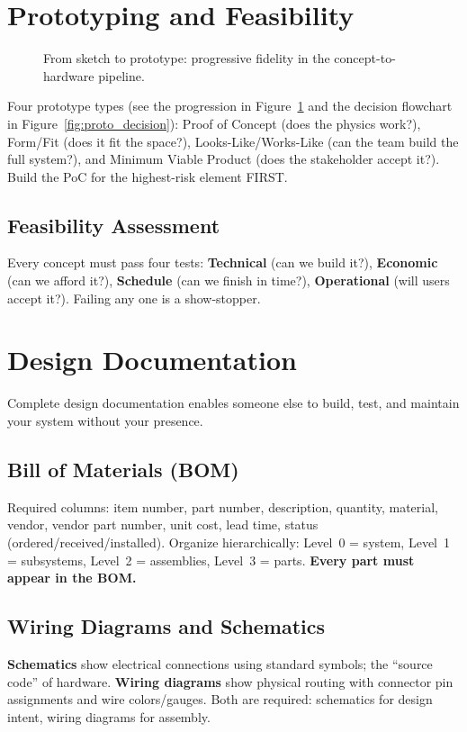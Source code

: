 \section{Prototyping and Feasibility}

\begin{figure}[htbp]\centering

\caption{From sketch to prototype: progressive fidelity in the concept-to-hardware pipeline.}\label{fig:sketch_to_proto}\end{figure}

Four prototype types (see the progression in Figure~\ref{fig:sketch_to_proto} and the decision flowchart in Figure~\ref{fig:proto_decision}): Proof of Concept (does the physics work?), Form/Fit (does it fit the space?), Looks-Like/Works-Like (can the team build the full system?), and Minimum Viable Product (does the stakeholder accept it?). Build the PoC for the highest-risk element FIRST.

\subsection{Feasibility Assessment}
Every concept must pass four tests: \textbf{Technical} (can we build it?), \textbf{Economic} (can we afford it?), \textbf{Schedule} (can we finish in time?), \textbf{Operational} (will users accept it?). Failing any one is a show-stopper.


\section{Design Documentation}
Complete design documentation enables someone else to build, test, and maintain your system without your presence.

\subsection{Bill of Materials (BOM)}
Required columns: item number, part number, description, quantity, material, vendor, vendor part number, unit cost, lead time, status (ordered/received/installed). Organize hierarchically: Level~0 = system, Level~1 = subsystems, Level~2 = assemblies, Level~3 = parts. \textbf{Every part must appear in the BOM.}

\subsection{Wiring Diagrams and Schematics}
\textbf{Schematics} show electrical connections using standard symbols; the ``source code'' of hardware. \textbf{Wiring diagrams} show physical routing with connector pin assignments and wire colors/gauges. Both are required: schematics for design intent, wiring diagrams for assembly.


